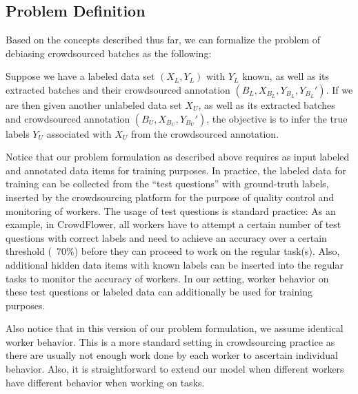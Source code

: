 \subsection{Problem Definition}

Based on the concepts described thus far, 
we can formalize the problem of debiasing crowdsourced batches as the following:

\begin{problem} 
Suppose we have a labeled data set $(X_L, Y_L)$ with $Y_L$ known, 
as well as its extracted batches and their crowdsourced annotation $(B_L, X_{B_L}, Y_{B_L}, Y_{B_L}')$.  
If we are then given another unlabeled data set $X_U$, 
as well as its extracted batches and crowdsourced annotation $(B_U, X_{B_U}, Y_{B_U}')$, 
the objective is to infer the true labels $Y_{U}$ associated with $X_{U}$ from the crowdsourced annotation.  
\end{problem}
Notice that our problem formulation as described above requires
as input labeled and annotated data items for training purposes. 
In practice, the labeled data for training 
can be collected from the ``test questions'' 
with ground-truth labels, 
inserted by the crowdsourcing platform for the 
purpose of quality control and monitoring
of workers.  
The usage of test questions is standard practice: 
As an example, in CrowdFlower, all workers have to attempt a 
certain number of test questions with correct labels 
and need to achieve an accuracy over a certain threshold (\eg~70\%) 
before they can proceed to work on the regular task(s).  
Also, additional hidden data items with known labels 
can be inserted into the regular tasks
to monitor the accuracy of workers.  
In our setting, worker behavior on these
test questions or labeled data can additionally be used
for training purposes.


Also notice that in this version of our problem
formulation, we assume identical worker behavior.  
This is a more standard setting in crowdsourcing practice 
as there are usually not enough work done by each worker to ascertain individual behavior.
Also, it is straightforward to extend our model when 
different workers have different behavior when working on tasks.



